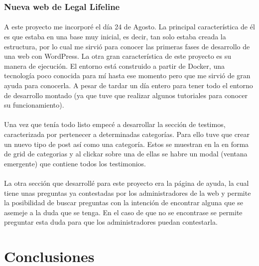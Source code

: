 \documentclass[10pt, a4paper,spanish]{article}
\begin{document}
            \subsubsection{Nueva web de Legal Lifeline}

                \paragraph{}
                A este proyecto me incorporé el día 24 de Agosto. La principal característica de él es que estaba en una base muy inicial, es decir, tan solo estaba creada la estructura, por lo cual me sirvió para conocer las primeras fases de desarrollo de una web con WordPress. La otra gran característica de este proyecto es su manera de ejecución. El entorno está construido a partir de Docker, una tecnología poco conocida para mí hasta ese momento pero que me sirvió de gran ayuda para conocerla. A pesar de tardar un día entero para tener todo el entorno de desarrollo montado (ya que tuve que realizar algunos tutoriales para conocer su funcionamiento).

                \paragraph{}
                Una vez que tenía todo listo empecé a desarrollar la sección de testimos, caracterizada por pertenecer a determinadas categorías. Para ello tuve que crear un nuevo tipo de post así como una categoría. Estos se muestran en la en forma de grid de categorias y al clickar sobre una de ellas se habre un modal (ventana emergente) que contiene todos los testimonios.

                \paragraph{}
                La otra sección que desarrollé para este proyecto era la página de ayuda, la cual tiene unas preguntas ya contestadas por los administradores de la web y permite la posibilidad de buscar preguntas con la intención de encontrar alguna que se asemeje a la duda que se tenga. En el caso de que no se encontrase se permite preguntar esta duda para que los administradores puedan contestarla.


    \section{Conclusiones}
\end{document}
